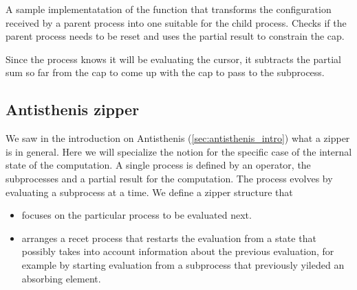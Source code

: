 \begin{code}

  \caption{\label{lst:localizeconf}A sample implementatation of the
    function that transforms the configuration received by a parent
    process into one suitable for the child process. Checks if the
    parent process needs to be reset and uses the partial result to
    constrain the cap.}
\end{code}

Since the process knows it will be evaluating the cursor, it subtracts
the partial sum so far from the cap to come up with the cap to pass to
the subprocess.


\subsection{Antisthenis zipper}
\label{sec:zipper}
We saw in the introduction on Antisthenis
(\ref{sec:antisthenis_intro}) what a zipper is in general. Here we
will specialize the notion for the specific case of the internal state
of the computation. A single process is defined by an operator, the
subprocesses and a partial result for the computation. The process
evolves by evaluating a subprocess at a time. We define a zipper
structure that

\begin{itemize}
\item focuses on the particular process to be evaluated next.
\item arranges a recet process that restarts the evaluation from a
  state that possibly takes into account information about the
  previous evaluation, for example by starting evaluation from a
  subprocess that previously yileded an absorbing element.
\end{itemize}

